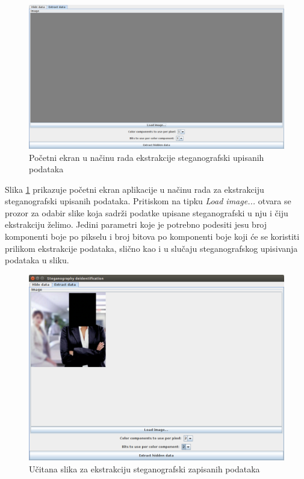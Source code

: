 \documentclass[times, utf8, seminar, numeric]{fer}
\begin{document}
\begin{figure}[H]
\caption{Početni ekran u načinu rada ekstrakcije steganografski upisanih podataka}
\label{app_home_screen_extract}
\centerline{\includegraphics[scale=0.4]{images/app_home_screen_extract.png}}
\end{figure}

Slika \ref{app_home_screen_extract} prikazuje početni ekran aplikacije u načinu rada za ekstrakciju steganografski upisanih podataka. Pritiskom na tipku \textit{Load image...} otvara se prozor za odabir slike koja sadrži podatke upisane steganografski u nju i čiju ekstrakciju želimo. Jedini parametri koje je potrebno podesiti jesu broj komponenti boje po pikselu i broj bitova po komponenti boje koji će se koristiti prilikom ekstrakcije podataka, slično kao i u slučaju steganografskog upisivanja podataka u sliku.

\begin{figure}[H]
\caption{Učitana slika za ekstrakciju steganografski zapisanih podataka}
\label{app_loaded_screen_extract}
\centerline{\includegraphics[scale=0.4]{images/app_loaded_screen_extract.png}}
\end{figure}
\end{document}
